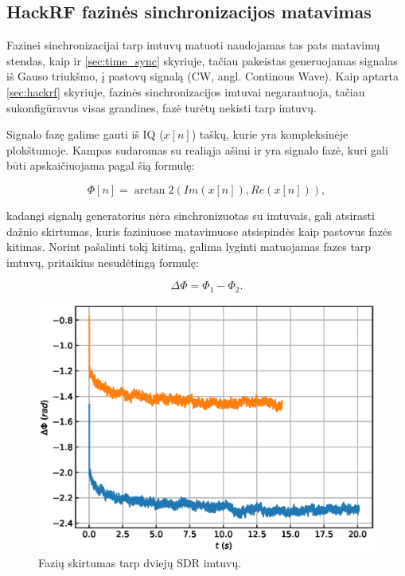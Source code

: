 \documentclass[main.tex]{subfiles}
\begin{document}
\subsection{HackRF fazinės sinchronizacijos matavimas}

Fazinei sinchronizacijai tarp imtuvų matuoti naudojamas tas pats matavimų stendas,
kaip ir \ref{sec:time_sync} skyriuje, tačiau pakeistas generuojamas
signalas iš Gauso triukšmo, į pastovų signalą (CW, angl. Continous Wave).
Kaip aptarta \ref{sec:hackrf} skyriuje, fazinės sinchronizacijos
imtuvai negarantuoja, tačiau sukonfigūravus visas grandines,
fazė turėtų nekisti tarp imtuvų.

Signalo fazę galime gauti iš IQ ($x[n]$) taškų, kurie yra kompleksinėje plokštumoje. Kampas
sudaromas su realiąja ašimi ir yra signalo fazė, kuri gali būti apskaičiuojama pagal šią
formulę:

\begin{equation}
    \Phi[n] = \arctan2(Im(x[n]), Re(x[n])),
\end{equation}

\noindent kadangi signalų generatorius nėra sinchronizuotas su imtuvais, gali atsirasti
dažnio skirtumas, kuris faziniuose matavimuose atsispindės kaip pastovus fazės kitimas.
Norint pašalinti tokį kitimą, galima lyginti matuojamas fazes tarp imtuvų, pritaikius nesudėtingą
formulę:

\begin{equation}
    \Delta \Phi = \Phi_1 - \Phi_2.
\end{equation}

\begin{figure}[h]
    \begin{centering}
    \includegraphics[scale=1.0]{drawings/phase_sync}
    \par\end{centering}
    \protect\caption{\label{fig:phase_sync_result}Fazių skirtumas tarp dviejų SDR imtuvų.}
\end{figure}
\end{document}
